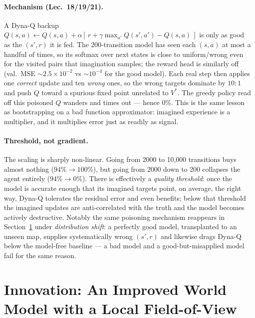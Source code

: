 \documentclass[11pt]{article}
\begin{document}
\paragraph{Mechanism (Lec.~18/19/21).}
A Dyna-Q backup $Q(s,a)\leftarrow Q(s,a)+\alpha[\,r+\gamma\max_{a'}Q(s',a')-Q(s,a)\,]$
is only as good as the $(s',r)$ it is fed. The 200-transition model has seen each
$(s,a)$ at most a handful of times, so its softmax over next states is close to
uniform/wrong even for the visited pairs that imagination samples; the reward head
is similarly off (val.\ MSE $\sim\!2.5\times10^{-2}$ vs $\sim\!10^{-4}$ for the
good model). Each real step then applies one \emph{correct} update and ten
\emph{wrong} ones, so the wrong targets dominate by $10{:}1$ and push $Q$ toward a
spurious fixed point unrelated to $V^*$. The greedy policy read off this poisoned
$Q$ wanders and times out --- hence $0\%$. This is the same lesson as bootstrapping
on a bad function approximator: imagined experience is a multiplier, and it
multiplies error just as readily as signal.

\paragraph{Threshold, not gradient.}
The scaling is sharply non-linear. Going from 2000 to 10{,}000 transitions buys
almost nothing ($94\%\!\to\!100\%$), but going from 2000 down to 200 collapses the
agent entirely ($94\%\!\to\!0\%$). There is effectively a \emph{quality threshold}:
once the model is accurate enough that its imagined targets point, on average, the
right way, Dyna-Q tolerates the residual error and even benefits; below that
threshold the imagined updates are anti-correlated with the truth and the model
becomes actively destructive. Notably the same poisoning mechanism reappears in
Section~\ref{sec:innovation} under \emph{distribution shift}: a perfectly good
model, transplanted to an unseen map, supplies systematically wrong $(s',r)$ and
likewise drags Dyna-Q below the model-free baseline --- a bad model and a
good-but-misapplied model fail for the same reason.

\section{Innovation: An Improved World Model with a Local Field-of-View}\label{sec:innovation}
\end{document}
